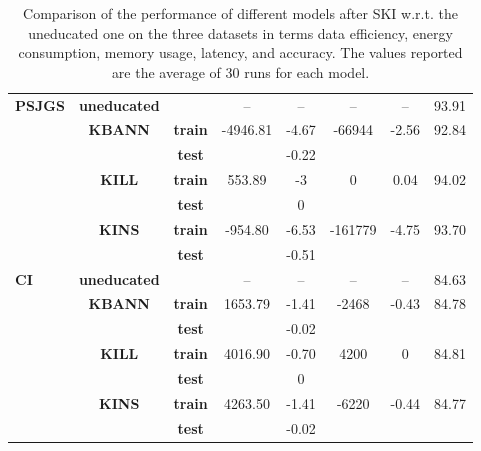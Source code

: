 \begin{table}
\begin{adjustbox}{width=\linewidth,center}
\begin{tabular}{l|c|c|c|c|c|c|c}
            \multirow{7}{*}{\textbf{PSJGS}} & \textbf{uneducated} & & -- & -- & -- & -- & 93.91\\
            \cline{2-8}
            & \multirow{2}{*}{\textbf{KBANN}} & \textbf{train} & \multirow{2}{*}{-4946.81} & -4.67 & \multirow{2}{*}{-66944} & \multirow{2}{*}{-2.56} & \multirow{2}{*}{92.84}\\
            & & \textbf{test} & & -0.22 & &  & \\
            \cline{2-8}
            & \multirow{2}{*}{\textbf{KILL}} & \textbf{train} & \multirow{2}{*}{553.89} & -3 & \multirow{2}{*}{0} & \multirow{2}{*}{0.04} & \multirow{2}{*}{94.02}\\
            & & \textbf{test} & & 0 & &  & \\
            \cline{2-8}
            & \multirow{2}{*}{\textbf{KINS}} & \textbf{train} & \multirow{2}{*}{-954.80} & -6.53 & \multirow{2}{*}{-161779} & \multirow{2}{*}{-4.75} & \multirow{2}{*}{93.70}\\
            & & \textbf{test} & & -0.51 & & & \\
            \midrule


            \multirow{7}{*}{\textbf{CI}} & \textbf{uneducated} & & -- & -- & -- & -- & 84.63\\
            \cline{2-8}
            & \multirow{2}{*}{\textbf{KBANN}} & \textbf{train} & \multirow{2}{*}{1653.79} & -1.41 & \multirow{2}{*}{-2468} & \multirow{2}{*}{-0.43} & \multirow{2}{*}{84.78}\\
            & & \textbf{test} & & -0.02 & & & \\
            \cline{2-8}
            & \multirow{2}{*}{\textbf{KILL}} & \textbf{train} & \multirow{2}{*}{4016.90} & -0.70 & \multirow{2}{*}{4200} & \multirow{2}{*}{0} & \multirow{2}{*}{84.81}\\
            & & \textbf{test} & & 0 & &  & \\
            \cline{2-8}
            & \multirow{2}{*}{\textbf{KINS}} & \textbf{train} & \multirow{2}{*}{4263.50} & -1.41 & \multirow{2}{*}{-6220} & \multirow{2}{*}{-0.44} & \multirow{2}{*}{84.77}\\
            & & \textbf{test} & & -0.02 & & & \\
            \bottomrule
        \end{tabular}
    \end{adjustbox}
    \caption[QoS results for different \gls{SKI} methods]{
        Comparison of the performance of different models after \gls{SKI} w.r.t. the uneducated one on the three datasets in terms data efficiency, energy consumption, memory usage, latency, and accuracy.
        The values reported are the average of 30 runs for each model.
    }
    \label{tab:qos-results}
\end{table}

